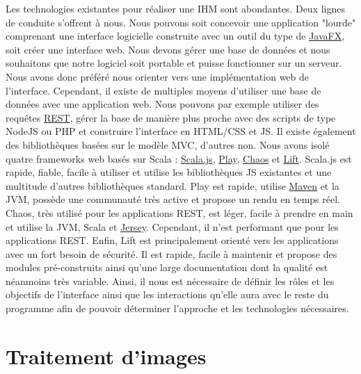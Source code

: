Les technologies existantes pour réaliser une IHM sont abondantes. Deux lignes de conduite s'offrent à nous. Nous pouvons
soit concevoir une application "lourde" comprenant une interface logicielle construite avec un outil du type de
\href{https://fr.wikipedia.org/wiki/JavaFX}{JavaFX}, soit créer une interface web. Nous devons gérer une base de données et
nous souhaitons que notre logiciel soit portable et puisse fonctionner sur un serveur. Nous avons donc préféré nous orienter
vers une implémentation web de l'interface. Cependant, il existe de multiples moyens d'utiliser une base de données avec une
application web. Nous pouvons par exemple utiliser des requêtes \href{https://en.wikipedia.org/wiki/Representational_state_transfer}{REST},
gérer la base de manière plus proche avec des scripts de type NodeJS ou PHP et construire l'interface en HTML/CSS et JS.
Il existe également des bibliothèques basées sur le modèle MVC, d'autres non. Nous avons isolé quatre frameworks web basés sur Scala :
\href{http://www.scala-js.org/}{Scala.js}, \href{https://www.playframework.com/}{Play},
\href{https://sourceforge.net/p/chaosuiframework/wiki/Home/}{Chaos} et \href{https://www.liftweb.net/}{Lift}. Scala.js est rapide,
fiable, facile à utiliser et utilise les bibliothèques JS existantes et une multitude d'autres bibliothèques standard.
Play est rapide, utilise \href{http://maven.apache.org/}{Maven} et la JVM, possède une communauté très active et propose un
rendu en temps réel. Chaos, très utilisé pour les applications REST, est léger, facile à prendre en main et utilise la JVM,
Scala et \href{https://jersey.github.io/}{Jersey}. Cependant, il n'est performant que pour les applications REST.
Enfin, Lift est principalement orienté vers les applications avec un fort besoin de sécurité. Il est rapide, facile à maintenir et
propose des modules pré-construits ainsi qu'une large documentation dont la qualité est néanmoins très variable. Ainsi, il nous
est nécessaire de définir les rôles et les objectifs de l'interface ainsi que les interactions qu'elle aura avec le reste du
programme afin de pouvoir déterminer l'approche et les technologies nécessaires.

\section{Traitement d'images}

